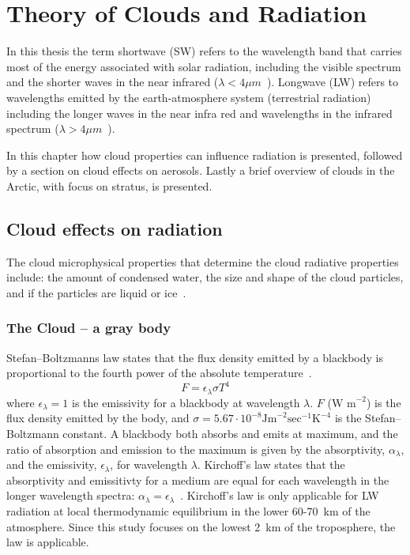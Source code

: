 \chapter{Theory of Clouds and Radiation}%
\label{chap:theory}
In this thesis the term shortwave (SW) refers to the wavelength band that carries most of the energy associated with solar radiation, including the visible spectrum and the shorter waves in the near infrared ($\lambda < 4\mu m$~\citep{Wallace2006}). Longwave (LW) refers to wavelengths emitted by the earth-atmosphere system (terrestrial radiation) including the longer waves in the near infra red and wavelengths in the infrared spectrum ($\lambda > 4\mu m$~\citep{Wallace2006}). 

In this chapter how cloud properties can influence radiation is presented, followed by a section on cloud effects on aerosols. Lastly a brief overview of clouds in the Arctic, with focus on stratus, is presented. 

\section{Cloud effects on radiation}
The cloud microphysical properties that determine the cloud radiative properties include: the amount of condensed water, the size and shape of the cloud particles, and if the particles are liquid or ice~\citep{Curry1996}.

\subsection{The Cloud -- a gray body}
Stefan–Boltzmanns law states that the flux density emitted by a blackbody is proportional to the fourth power of the absolute temperature~\citep{Liou2002}. 
\begin{equation}
F = \epsilon_{\lambda} \sigma T^4
\label{eqn:stefanboltzmann}
\end{equation}
where $\epsilon_{\lambda} = 1$ is the emissivity for a blackbody at wavelength $\lambda$. $F$ ($\text{W~m}^{-2}$) is the flux density emitted  by the body, and $\sigma = 5.67\cdot 10^{-8} \text{Jm}^{-2}\text{sec}^{-1}\text{K}^{-4}$ is the Stefan–Boltzmann constant. A blackbody both absorbs and emits at maximum, and the ratio of absorption and emission to the maximum is given by the absorptivity, $\alpha_{\lambda}$, and the emissivity, $\epsilon_{\lambda}$, for wavelength $\lambda$. Kirchoff's law states that the absorptivity and emissitivty for a medium are equal for each wavelength in the longer wavelength spectra: $\alpha_{\lambda} = \epsilon_{\lambda}$~\citep{Liou2002}. Kirchoff's law is only applicable for LW radiation at local thermodynamic equilibrium in the lower 60-70~km of the atmosphere. Since this study focuses on the lowest 2~km of the troposphere, the law is applicable.

